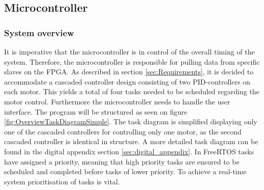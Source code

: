 \documentclass[../../main.tex]{subfiles}
\begin{document}
\subsection{Microcontroller} \label{subsec:SystemImplementationMicroController}

\subsubsection*{System overview}
\label{subsec:SystemImplementationOperatingSystem}
It is imperative that the microcontroller is in control of the overall timing of the system. Therefore, the microcontroller is responsible for pulling data from specific slaves on the FPGA. As described in section \ref{sec:Requirements}, it is decided to accommodate a cascaded controller design consisting of two PID-controllers on each motor. This yields a total of four tasks needed to be scheduled regarding the motor control. Furthermore the microcontroller needs to handle the user interface. The program will be structured as seen on figure \ref{fig:OverviewTaskDiagramSimple}. The task diagram is simplified displaying only one of the cascaded controllers for controlling only one motor, as the second cascaded controller is identical in structure. A more detailed task diagram can be found in the digital appendix section \ref{sec:digital_appendix}. In FreeRTOS tasks have assigned a priority, meaning that high priority tasks are ensured to be scheduled and completed before tasks of lower priority. To achieve a real-time system prioritisation of tasks is vital.






\end{document}
